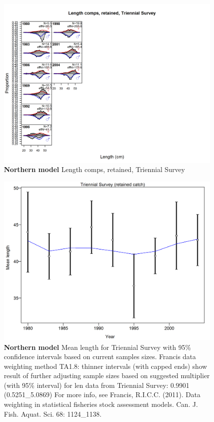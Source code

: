 \documentclass[12pt,]{article}
\begin{document}
\begin{figure}[htbp]
\centering
\includegraphics{./r4ss/plots_mod1/comp_lenfit_flt5mkt2.png}
\caption{\textbf{Northern model} Length comps, retained, Triennial
Survey \label{fig:mod1_22_comp_lenfit_flt5mkt2}}
\end{figure}

\begin{figure}[htbp]
\centering
\includegraphics{./r4ss/plots_mod1/comp_lenfit_data_weighting_TA1.8_Triennial Survey.png}
\caption{\textbf{Northern model} Mean length for Triennial Survey with
95\% confidence intervals based on current samples sizes. Francis data
weighting method TA1.8: thinner intervals (with capped ends) show result
of further adjusting sample sizes based on suggested multiplier (with
95\% interval) for len data from Triennial Survey: 0.9901
(0.5251\_5.0869) For more info, see Francis, R.I.C.C. (2011). Data
weighting in statistical fisheries stock assessment models. Can. J.
Fish. Aquat. Sci. 68: 1124\_1138.
\label{fig:mod1_25_comp_lenfit_data_weighting_TA1.8_Triennial Survey}}
\end{figure}
\end{document}
